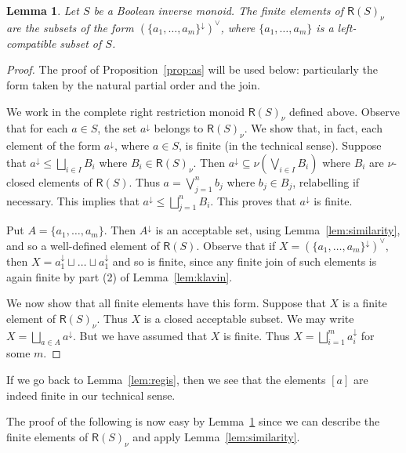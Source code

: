 \documentclass[a4paper]{amsart}
\newtheorem{lemma}[theorem]{Lemma}
\begin{document}
\begin{lemma}\label{lem:STJ} Let $S$ be a Boolean inverse monoid.
The finite elements of $\mathsf{R}(S)_{\nu}$  are the subsets of the form 
$(\{a_{1}, \ldots, a_{m}\}^{\downarrow})^{\vee}$,
where $\{a_{1}, \ldots, a_{m}\}$ is a left-compatible subset of $S$.
\end{lemma} 
\begin{proof} The proof of Proposition~\ref{prop:as} will be used below:
particularly the form taken by the natural partial order and the join.

We work in the complete right restriction monoid $\mathsf{R}(S)_{\nu}$ defined above.
Observe that for each $a \in S$, the set $a^{\downarrow}$ belongs to $\mathsf{R}(S)_{\nu}$.
We show that, in fact, each element of the form $a^{\downarrow}$, where $a \in S$, is finite (in the technical sense).
Suppose that $a^{\downarrow} \leq \bigsqcup_{i \in I} B_{i}$  
where $B_{i} \in  \mathsf{R}(S)_{\nu}$.
Then $a^{\downarrow} \subseteq \nu ( \bigvee_{i \in I} B_{i})$  
where $B_{i}$ are $\nu$-closed elements of $\mathsf{R}(S)$.
Thus $a = \bigvee_{j=1}^{n} b_{j}$ where $b_{j} \in B_{j}$,
relabelling if necessary.
This implies that $a^{\downarrow} \leq \bigsqcup_{j = 1}^{n} B_{i}$.
This proves that $a^{\downarrow}$ is finite. 


Put $A = \{a_{1}, \ldots, a_{m}\}$. 
Then $A^{\downarrow}$ is an acceptable set, using Lemma~\ref{lem:similarity}, and so a well-defined element of  $\mathsf{R}(S)$.
Observe that if $X = (\{a_{1}, \ldots, a_{m}\}^{\downarrow})^{\vee}$,
then $X = a_{1}^{\downarrow} \sqcup \ldots \sqcup a_{1}^{\downarrow}$ 
and so is finite, since any finite join of such elements is again finite
by part (2) of Lemma~\ref{lem:klavin}. 

We now show that all finite elements have this form.
Suppose that $X$ is a finite element of  $\mathsf{R}(S)_{\nu}$.
Thus $X$ is a closed acceptable subset.
We may write $X = \bigsqcup_{a \in A} a^{\downarrow}$.
But we have assumed that $X$ is finite.
Thus $X = \bigsqcup_{i=1}^{m} a_{i}^{\downarrow}$ for some $m$.
\end{proof}

If we go back to Lemma~\ref{lem:regis}, then we see that the elements $[a]$
are indeed finite in our technical sense.


The proof of the following is now easy by Lemma~\ref{lem:STJ}
since we can describe the finite elements of $\mathsf{R}(S)_{\nu}$
and apply Lemma~\ref{lem:similarity}. 
\end{document}
